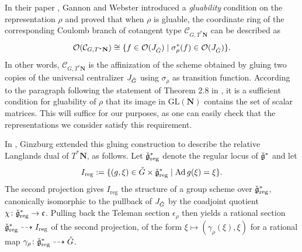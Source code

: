 \documentclass[11pt]{article}
\theoremstyle{definition}
\theoremstyle{plain}
\theoremstyle{remark}
\newcommand{\GL}{\mathrm{GL}}
\newcommand{\coulomb}[2]{\mathcal{C}_{{#1},{#2}}}
\DeclareMathOperator{\Ad}{Ad}
\begin{document}
        In their paper \cite{gannon2025functorialitycoulombbranches}, Gannon and Webster introduced a \emph{gluability} condition on the representation $\rho$ and proved that when $\rho$ is gluable, the coordinate ring of the corresponding Coulomb branch of cotangent type $\coulomb{G}{T^*\mathbf{N}}$ can be described as
        \[
            \mathcal{O}(\coulomb{G}{T^*\mathbf{N}}) \cong \{f \in \mathcal{O}(J_{\Check{G}}) \mid \sigma_\rho^*(f) \in \mathcal{O}(J_{\Check{G}})\}.
        \]
        In other words, $\coulomb{G}{T^*\mathbf{N}}$ is the affinization of the scheme obtained by gluing two copies of the universal centralizer $J_{\Check{G}}$ using $\sigma_\rho$ as transition function. According to the paragraph following the statement of Theorem 2.8 in \cite{gannon2025functorialitycoulombbranches}, it is a sufficient condition for gluability of $\rho$ that its image in $\GL(\mathbf{N})$ contains the set of scalar matrices. This will suffice for our purposes, as one can easily check that the representations we consider satisfy this requirement.

        In \cite{ginzburg2025pointwisepurityderivedsatake}, Ginzburg extended this gluing construction to describe the relative Langlands dual of $T^*\mathbf{N}$, as follows. Let $\Check{\mathfrak{g}}^*_{\mathrm{reg}}$ denote the regular locus of $\Check{\mathfrak{g}}^*$ and let
        \[
            I_{\mathrm{reg}}:=\{(g,\xi) \in \Check{G} \times \Check{\mathfrak{g}}^*_{\mathrm{reg}} \mid \Ad g(\xi) = \xi\}.
        \]                
        The second projection gives $I_\mathrm{reg}$ the structure of a group scheme over $\Check{\mathfrak{g}}^*_{\mathrm{reg}}$, canonically isomorphic to the pullback of $J_{\Check{G}}$ by the coadjoint quotient $\chi\colon \Check{\mathfrak{g}}^*_{\mathrm{reg}} \to \mathfrak{c}$. Pulling back the Teleman section $\epsilon_\rho$ then yields a rational section $\Check{\mathfrak{g}}^*_{\mathrm{reg}} \dashrightarrow I_{\mathrm{reg}}$ of the second projection, of the form $\xi \mapsto (\gamma_\rho(\xi),\xi)$ for a rational map $\gamma_\rho\colon \Check{\mathfrak{g}}^*_{\mathrm{reg}} \dashrightarrow \Check{G}$. 
        
\end{document}
